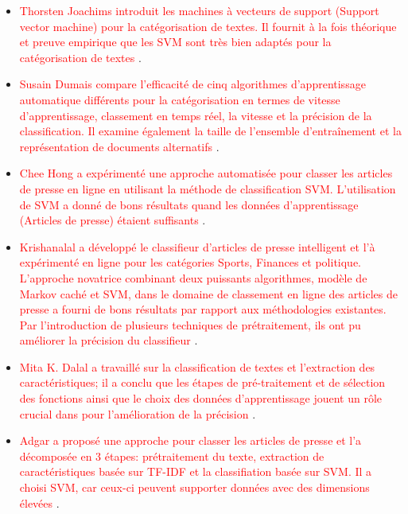      \begin{itemize}
        
     \item  \textcolor{red}{Thorsten Joachims introduit les machines à vecteurs de support (Support vector machine) pour la catégorisation de textes. Il fournit à la fois théorique et preuve empirique que les SVM sont très bien adaptés pour la catégorisation de textes \cite{itemetat1}}. 
     
     \item  \textcolor{red}{Susain Dumais compare l'efficacité de cinq algorithmes d'apprentissage automatique différents pour la catégorisation en termes de vitesse d'apprentissage, classement en temps réel, la vitesse et la précision de la classification. Il examine également la taille de l'ensemble d'entraînement et la représentation de documents alternatifs \cite{itemetat2}}.
     
     \item  \textcolor{red}{Chee Hong a expérimenté une approche automatisée pour classer les articles de presse en ligne en utilisant la méthode de classification SVM. L'utilisation de SVM a donné de bons résultats quand les données d'apprentissage (Articles de presse) étaient suffisants \cite{itemetat3}}.
      
     \item  \textcolor{red}{Krishanalal a développé le classifieur d'articles de presse intelligent et l'à expérimenté en ligne pour les catégories Sports, Finances et politique. L'approche novatrice combinant deux puissants algorithmes, modèle de Markov caché et SVM, dans le domaine de classement en ligne des articles de presse a fourni de bons résultats par rapport aux méthodologies existantes. Par l'introduction de plusieurs techniques de prétraitement, ils ont pu améliorer la précision du classifieur \cite{itemetat6}}.
     
     \item  \textcolor{red}{Mita K. Dalal a travaillé sur la classification de textes et l'extraction des caractéristiques; il a conclu que les étapes de pré-traitement et de sélection des fonctions ainsi que le choix des données d'apprentissage jouent un rôle crucial dans pour l'amélioration de la précision \cite{itemetat7}}. 
     
     \item  \textcolor{red}{Adgar a proposé une approche pour classer les articles de presse et l'a décomposée en 3 étapes: prétraitement du texte, extraction de caractéristiques basée sur TF-IDF et la classifiation basée sur SVM.
     Il a choisi SVM, car ceux-ci peuvent supporter données avec des dimensions élevées \cite{itemetat8}}.
     
     \end{itemize}
        

